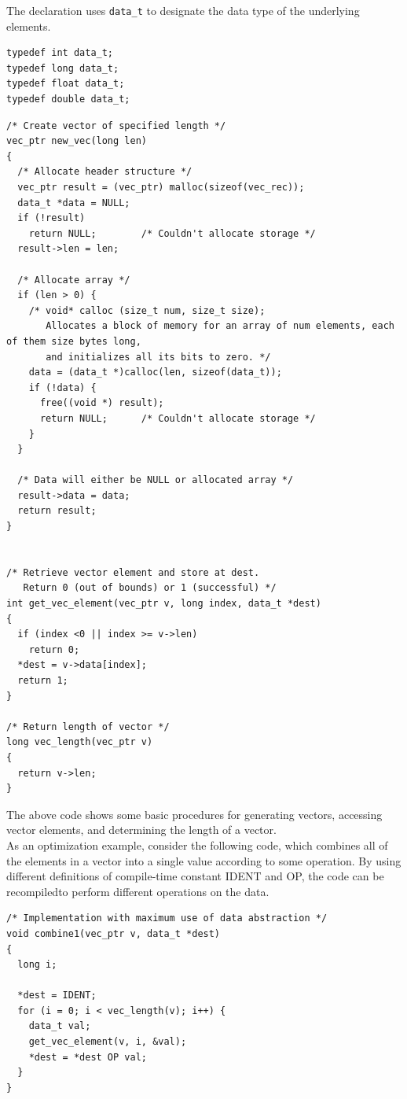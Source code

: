 \documentclass[11pt]{article}
\begin{document}
The declaration uses \texttt{data\_t} to designate the data type of the underlying elements.\\
\begin{verbatim}
typedef int data_t;
typedef long data_t;
typedef float data_t;
typedef double data_t;
\end{verbatim}

\begin{verbatim}
/* Create vector of specified length */
vec_ptr new_vec(long len)
{
  /* Allocate header structure */
  vec_ptr result = (vec_ptr) malloc(sizeof(vec_rec));
  data_t *data = NULL;
  if (!result)
    return NULL;		/* Couldn't allocate storage */
  result->len = len;

  /* Allocate array */
  if (len > 0) {
    /* void* calloc (size_t num, size_t size);
       Allocates a block of memory for an array of num elements, each of them size bytes long,
       and initializes all its bits to zero. */
    data = (data_t *)calloc(len, sizeof(data_t));
    if (!data) {
      free((void *) result);
      return NULL;		/* Couldn't allocate storage */
    }
  }

  /* Data will either be NULL or allocated array */
  result->data = data;
  return result;
}


/* Retrieve vector element and store at dest.
   Return 0 (out of bounds) or 1 (successful) */
int get_vec_element(vec_ptr v, long index, data_t *dest)
{
  if (index <0 || index >= v->len)
    return 0;
  *dest = v->data[index];
  return 1;
}

/* Return length of vector */
long vec_length(vec_ptr v)
{
  return v->len;
}

\end{verbatim}

The above code shows some basic procedures for generating vectors, accessing vector elements, and determining the length of a vector.\\

As an optimization example, consider the following code, which combines all of the elements in a vector into a single value according to some operation. By using different definitions of compile-time constant IDENT and OP, the code can be recompiledto perform different operations on the data.\\

\begin{verbatim}
/* Implementation with maximum use of data abstraction */
void combine1(vec_ptr v, data_t *dest)
{
  long i;

  *dest = IDENT;
  for (i = 0; i < vec_length(v); i++) {
    data_t val;
    get_vec_element(v, i, &val);
    *dest = *dest OP val;
  }
}

\end{verbatim}
\end{document}
